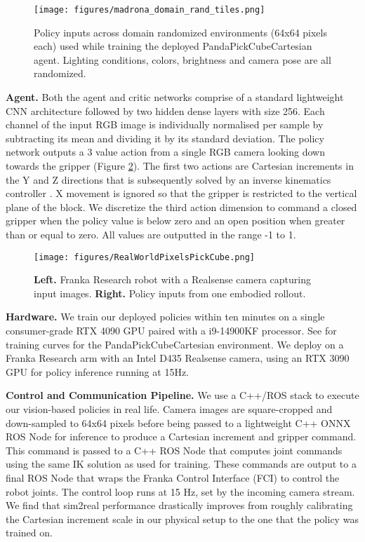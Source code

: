 \begin{figure}[t]
    \centering
    \texttt{[image: figures/madrona\_domain\_rand\_tiles.png]}
    \caption{\small Policy inputs across domain randomized environments (64x64 pixels each) used while training the deployed PandaPickCubeCartesian agent. Lighting conditions, colors, brightness and camera pose are all randomized.}
    \label{fig:madrona-highres-domain-rando}
\end{figure}

\textbf{Agent.} Both the agent and critic networks comprise of a standard lightweight CNN architecture \cite{mnih2015human} followed by two hidden dense layers with size 256. Each channel of the input RGB image is individually normalised per sample by subtracting its mean and dividing it by its standard deviation. The policy network outputs a 3 value action from a single RGB camera looking down towards the gripper (Figure \ref{fig:panda-pixels-real-setup}). The first two actions are Cartesian increments in the Y and Z directions that is subsequently solved by an inverse kinematics controller \cite{he2021analytical}. X movement is ignored so that the gripper is restricted to the vertical plane of the block. We discretize the third action dimension to command a closed gripper when the policy value is below zero and an open position when greater than or equal to zero. All values are outputted in the range -1 to 1.

\begin{figure}[t]
    \centering
    \texttt{[image: figures/RealWorldPixelsPickCube.png]}
    \caption{\small \textbf{Left.} Franka Research robot with a Realsense camera capturing input images. \textbf{Right.} Policy inputs from one embodied rollout.}
    \label{fig:panda-pixels-real-setup}
\end{figure}

\textbf{Hardware.} We train our deployed policies within ten minutes on a single consumer-grade RTX 4090 GPU paired with a i9-14900KF processor. See  for training curves for the PandaPickCubeCartesian environment. We deploy on a Franka Research arm with an Intel D435 Realsense camera, using an RTX 3090 GPU for policy inference running at 15Hz.

\textbf{Control and Communication Pipeline.} We use a C++/ROS stack to execute our vision-based policies in real life. Camera images are square-cropped and down-sampled to 64x64 pixels before being passed to a lightweight C++ ONNX ROS Node for inference to produce a Cartesian increment and gripper command. This command is passed to a C++ ROS Node that computes joint commands using the same IK solution as used for training. These commands are output to a final ROS Node that wraps the Franka Control Interface (FCI) to control the robot joints. The control loop runs at 15 Hz, set by the incoming camera stream. We find that sim2real performance drastically improves from roughly calibrating the Cartesian increment scale in our physical setup to the one that the policy was trained on.

\clearpage
